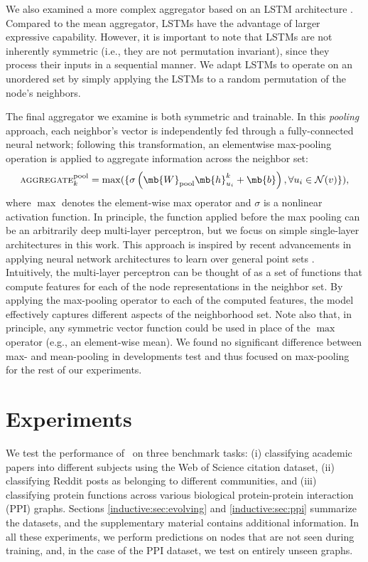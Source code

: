  We also examined a more complex aggregator based on an LSTM architecture \cite{hochreiter1997long}. 
Compared to the mean aggregator, LSTMs have the advantage of larger expressive capability. However, it is important to note that LSTMs are not inherently symmetric (i.e., they are not permutation invariant), since they process their inputs in a sequential manner.
We adapt LSTMs to operate on an unordered set by simply applying the LSTMs to a random permutation of the node's neighbors. 

 The final aggregator we examine is both symmetric and trainable.
In this {\em pooling} approach, each neighbor's vector is independently fed through a fully-connected neural network; following this transformation, an elementwise max-pooling operation is applied to aggregate information across the neighbor set:
\begin{equation}\label{eq:pool}
\textsc{aggregate}_k^{\textrm{pool}} = \max(\{\sigma\left(\mb{W}_{\textrm{pool}}\mb{h}^k_{u_i} + \mb{b}\right), \forall u_i \in \mathcal{N}(v)\}),
\end{equation}
where $\max$ denotes the element-wise max operator and $\sigma$ is a nonlinear activation function. 
In principle, the function applied before the max pooling can be an arbitrarily deep multi-layer perceptron, but we focus on simple single-layer architectures in this work. 
This approach is inspired by recent advancements in applying neural network architectures to learn over general point sets \cite{qi2016pointnet}.
Intuitively, the multi-layer perceptron can be thought of as a set of functions that compute features for each of the node representations in the neighbor set. By applying the max-pooling operator to each of the computed features, the model effectively captures different aspects of the neighborhood set. 
Note also that, in principle, any symmetric vector function could be used in place of the $\max$ operator (e.g., an element-wise mean). 
We found no significant difference between max- and mean-pooling in developments test and thus focused on max-pooling for the rest of our experiments. 


\section{Experiments}
\label{inductive:sec:exp}

We test the performance of \name\ on three benchmark tasks: (i) classifying academic papers into different subjects using the Web of Science
citation dataset, (ii) classifying Reddit posts as belonging to different communities, and (iii) classifying protein functions across various biological protein-protein interaction (PPI) graphs. Sections \ref{inductive:sec:evolving} and \ref{inductive:sec:ppi} summarize the datasets, and the supplementary material contains additional information.
In all these experiments, we perform predictions on nodes that are not seen during training, and, in the case of the PPI dataset, we test on entirely unseen graphs. 

